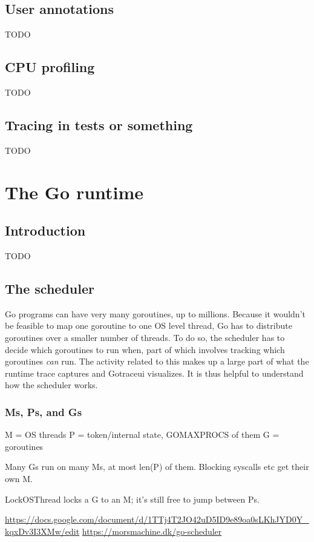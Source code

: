 \documentclass[10pt,letterpaper,oneside,openany,showtrims,draft]{memoir}
\newcommand{\todo}[1]{{\color{red}#1}}
\begin{document}
\section{User annotations}
\todo{TODO}

\section{CPU profiling}
\todo{TODO}

\section{\todo{Tracing in tests or something}}
\todo{TODO}

\chapter{The Go runtime}


\section{Introduction}
\todo{TODO}

\section{The scheduler}
Go programs can have very many goroutines, up to millions.
Because it wouldn't be feasible to map one goroutine to one OS level thread,
Go has to distribute goroutines over a smaller number of threads.
To do so, the scheduler has to decide which goroutines to run when,
part of which involves tracking which goroutines {\em can} run.
The activity related to this makes up a large part of what the runtime trace captures and Gotraceui visualizes.
It is thus helpful to understand how the scheduler works.

\subsection{Ms, Ps, and Gs}
\todo{
  M = OS threads
  P = token/internal state, GOMAXPROCS of them
  G = goroutines

  Many Gs run on many Ms, at most len(P) of them. Blocking syscalls etc get their own M.

  LockOSThread locks a G to an M; it's still free to jump between Ps.

  \url{https://docs.google.com/document/d/1TTj4T2JO42uD5ID9e89oa0sLKhJYD0Y_kqxDv3I3XMw/edit}
  \url{https://morsmachine.dk/go-scheduler}
}
\end{document}
